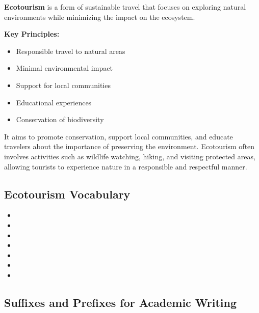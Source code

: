 \begin{grammarbox}[title=What is Ecotourism?]
\textbf{Ecotourism} is a form of sustainable travel that focuses on exploring natural environments while minimizing the impact on the ecosystem.

\textbf{Key Principles:}
\begin{itemize}
    \item Responsible travel to natural areas
    \item Minimal environmental impact
    \item Support for local communities
    \item Educational experiences
    \item Conservation of biodiversity
\end{itemize}

It aims to promote conservation, support local communities, and educate travelers about the importance of preserving the environment. Ecotourism often involves activities such as wildlife watching, hiking, and visiting protected areas, allowing tourists to experience nature in a responsible and respectful manner.
\end{grammarbox}

\subsection{Ecotourism Vocabulary}

\begin{vocabbox}[title=Sustainable Tourism Terms]
\begin{itemize}
    \item {} 
    \item {} 
    \item {} 
    \item {} 
    \item {} 
    \item {} 
    \item {} 
\end{itemize}
\end{vocabbox}

\subsection{Suffixes and Prefixes for Academic Writing}

